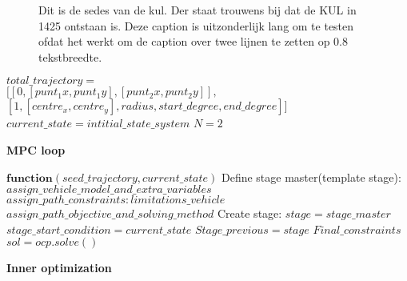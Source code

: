 \documentclass[main_adjusted]{subfiles}
\begin{document}
\begin{figure}
  \centering
  \caption{Dit is de sedes van  de kul. Der staat trouwens bij dat de KUL  in 1425 ontstaan is. Deze
    caption is  uitzonderlijk lang om te  testen ofdat het werkt  om de caption over  twee lijnen te
    zetten op 0.8 tekstbreedte.}
  \label{fig:sedes}
\end{figure}




\begin{algorithm}[H]
	\SetAlgoLined
	$total\_trajectory = $\\
	$[[0,[punt_1x,punt_1y],[punt_2x,punt_2y]],$\\
	$[1,[centre_x,centre_y],radius,start\_degree,end\_degree]]$\;
	$current\_state = intitial\_state\_system$\;
	$N = 2$\;
	\caption{\textbf{MPC loop}}
	\label{alg:3}
\end{algorithm}



\begin{algorithm}[H]
	\SetAlgoLined
	$\bm{function}(seed\_trajectory, current\_state)$\;
	Define stage master(template stage):\\
	$assign\_vehicle\_model\_and\_extra\_variables$\;
	$assign\_path\_constraints:limitations\_vehicle$\;
	$assign\_path\_objective\_and\_solving\_method$\;
	Create stage:
	$stage = stage\_master$
	$stage\_start\_condition = current\_state$\;
	$Stage\_previous = stage$\;
	$Final\_constraints$\;
	$sol = ocp.solve()$		
	\caption{\textbf{Inner optimization}}
	\label{alg:3}
\end{algorithm}
\end{document}
